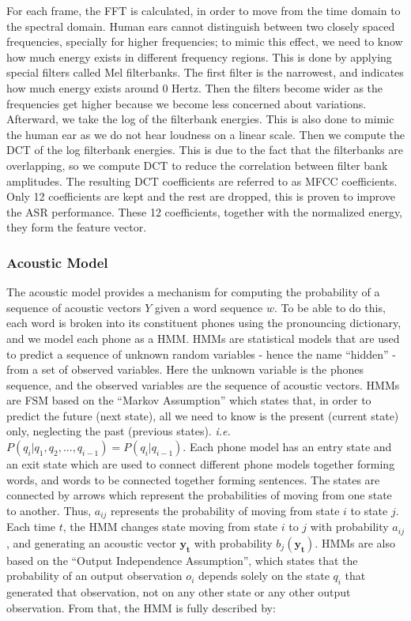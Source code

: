 For each frame, the \ac{FFT} is calculated, in order to move from the time domain to the spectral domain. Human ears cannot distinguish between two closely spaced frequencies, specially for higher frequencies; to mimic this effect, we need to know how much energy exists in different frequency regions. This is done by applying special filters called Mel filterbanks. The first filter is the narrowest, and indicates how much energy exists around 0 Hertz. Then the filters become wider as the frequencies get higher because we become less concerned about variations. 
Afterward, we take the log of the filterbank energies. This is also done to mimic the human ear as we do not hear loudness on a linear scale. 
Then we compute the \ac{DCT} of the log filterbank energies. This is due to the fact that the filterbanks are overlapping, so we compute \ac{DCT} to reduce the correlation between filter bank amplitudes. The resulting \ac{DCT} coefficients are referred to as MFCC coefficients. Only 12 coefficients are kept and the rest are dropped, this is proven to improve the \ac{ASR} performance. These 12 coefficients, together with the normalized energy, they form the feature vector.

\subsubsection{Acoustic Model} 
\label{bg:s3_sub1_subsub2}

The acoustic model provides a mechanism for computing the probability of a sequence of acoustic vectors $Y$ given a word sequence $w$. 
To be able to do this, each word is broken into its constituent phones using the pronouncing dictionary, and we model each phone as a \ac{HMM}. \ac{HMM}s are statistical models that are used to predict a sequence of unknown random variables - hence the name \enquote{hidden} -  from a set of observed variables. Here the unknown variable is the phones sequence, and the observed variables are the sequence of acoustic vectors. \ac{HMM}s are \ac{FSM} based on the \enquote{Markov Assumption} which states that, in order to predict the future (next state), all we need to know is the present  (current state) only, neglecting the past (previous states). \textit{i.e.} $ P(q_i|q_1,q_2,...,q_{i-1}) = P(q_i|q_{i-1}) $. Each phone model has an entry state and an exit state which are used to connect different phone models together forming words, and words to be connected together forming sentences. The states are connected by arrows which represent the probabilities of moving from one state to another. Thus, $a_{ij}$ represents the probability of moving from state $i$ to state $j$. Each time $t$, the \ac{HMM} changes state moving from state $i$ to $j$ with probability $a_{ij}$, and generating an acoustic vector $\mathbf{y_t}$ with probability $b_j(\mathbf{y_t})$. \ac{HMM}s are also based on the \enquote{Output Independence Assumption}, which states that the probability of an output observation $o_i$ depends solely on the state $q_i$ that generated that observation, not on any other state or any other output observation. From that, the \ac{HMM} is fully described by:

